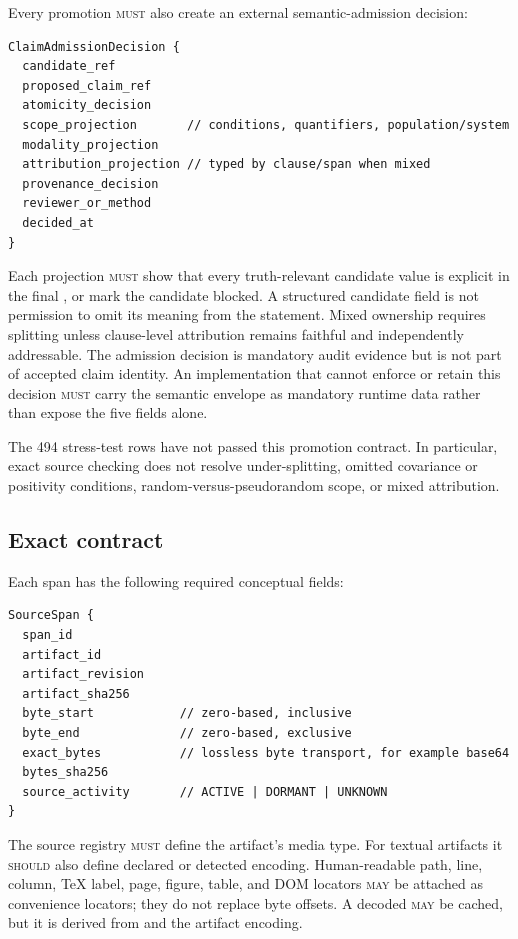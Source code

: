 Every promotion \textsc{must} also create an external semantic-admission decision:
\begin{lstlisting}[style=interface]
ClaimAdmissionDecision {
  candidate_ref
  proposed_claim_ref
  atomicity_decision
  scope_projection       // conditions, quantifiers, population/system
  modality_projection
  attribution_projection // typed by clause/span when mixed
  provenance_decision
  reviewer_or_method
  decided_at
}
\end{lstlisting}
Each projection \textsc{must} show that every truth-relevant candidate value is explicit in the final , or mark the candidate blocked. A structured candidate field is not permission to omit its meaning from the statement. Mixed ownership requires splitting unless clause-level attribution remains faithful and independently addressable. The admission decision is mandatory audit evidence but is not part of accepted claim identity. An implementation that cannot enforce or retain this decision \textsc{must} carry the semantic envelope as mandatory runtime data rather than expose the five fields alone.

The 494 stress-test rows have not passed this promotion contract. In particular, exact source checking does not resolve under-splitting, omitted covariance or positivity conditions, random-versus-pseudorandom scope, or mixed attribution.

\subsection{Exact \SourceSpan{} contract}

Each span has the following required conceptual fields:

\begin{lstlisting}[style=interface]
SourceSpan {
  span_id
  artifact_id
  artifact_revision
  artifact_sha256
  byte_start            // zero-based, inclusive
  byte_end              // zero-based, exclusive
  exact_bytes           // lossless byte transport, for example base64
  bytes_sha256
  source_activity       // ACTIVE | DORMANT | UNKNOWN
}
\end{lstlisting}

The source registry \textsc{must} define the artifact's media type. For textual artifacts it \textsc{should} also define declared or detected encoding. Human-readable path, line, column, TeX label, page, figure, table, and DOM locators \textsc{may} be attached as convenience locators; they do not replace byte offsets. A decoded  \textsc{may} be cached, but it is derived from  and the artifact encoding.

